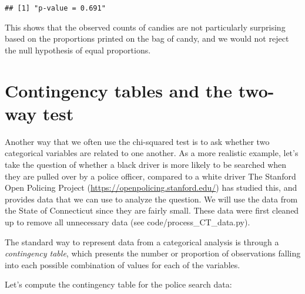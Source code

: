 \documentclass[]{book}
\newenvironment{Shaded}{\begin{snugshade}}{\end{snugshade}}
\newcommand{\KeywordTok}[1]{\textcolor[rgb]{0.13,0.29,0.53}{\textbf{#1}}}
\newcommand{\DataTypeTok}[1]{\textcolor[rgb]{0.13,0.29,0.53}{#1}}
\newcommand{\StringTok}[1]{\textcolor[rgb]{0.31,0.60,0.02}{#1}}
\newcommand{\CommentTok}[1]{\textcolor[rgb]{0.56,0.35,0.01}{\textit{#1}}}
\newcommand{\OperatorTok}[1]{\textcolor[rgb]{0.81,0.36,0.00}{\textbf{#1}}}
\newcommand{\NormalTok}[1]{#1}
\theoremstyle{definition}
\theoremstyle{definition}
\theoremstyle{definition}
\theoremstyle{remark}
\begin{document}
\begin{verbatim}
## [1] "p-value = 0.691"
\end{verbatim}

This shows that the observed counts of candies are not particularly
surprising based on the proportions printed on the bag of candy, and we
would not reject the null hypothesis of equal proportions.

\section{Contingency tables and the two-way
test}\label{contingency-tables-and-the-two-way-test}

Another way that we often use the chi-squared test is to ask whether two
categorical variables are related to one another. As a more realistic
example, let's take the question of whether a black driver is more
likely to be searched when they are pulled over by a police officer,
compared to a white driver The Stanford Open Policing Project
(\url{https://openpolicing.stanford.edu/}) has studied this, and
provides data that we can use to analyze the question. We will use the
data from the State of Connecticut since they are fairly small. These
data were first cleaned up to remove all unnecessary data (see
code/process\_CT\_data.py).

\begin{Shaded}
\end{Shaded}

The standard way to represent data from a categorical analysis is
through a \emph{contingency table}, which presents the number or
proportion of observations falling into each possible combination of
values for each of the variables.

Let's compute the contingency table for the police search data:

\begin{Shaded}
\end{Shaded}
\end{document}
